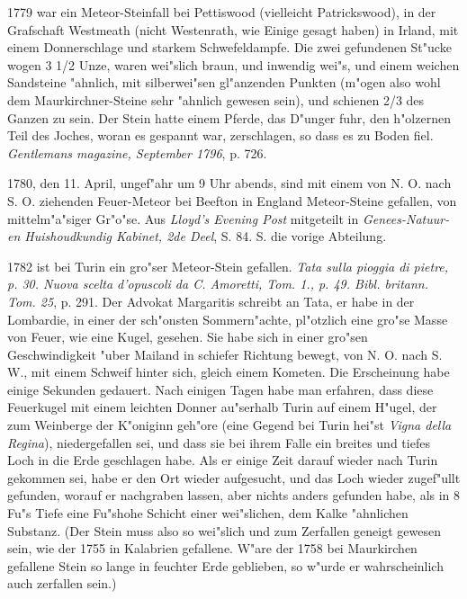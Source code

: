 \documentclass[a4paper, 11pt, oneside, polutonikogreek, german]{article}
\begin{document}
1779 war ein Meteor-Steinfall bei Pettiswood (vielleicht Patrickswood), in der Grafschaft Westmeath (nicht Westenrath, wie Einige gesagt haben) in Irland, mit einem Donnerschlage und starkem Schwefeldampfe. Die zwei gefundenen St"ucke wogen 3 1/2 Unze, waren wei"slich braun, und inwendig wei"s, und einem weichen Sandsteine "ahnlich, mit silberwei"sen gl"anzenden Punkten (m"ogen also wohl dem Maurkirchner-Steine sehr "ahnlich gewesen sein), und schienen 2/3 des Ganzen zu sein. Der Stein hatte einem Pferde, das D"unger fuhr, den h"olzernen Teil des Joches, woran es gespannt war, zerschlagen, so dass es zu Boden fiel. \emph{Gentlemans magazine, September 1796}, p. 726.

1780, den 11. April, ungef"ahr um 9 Uhr abends, sind mit einem von N. O. nach S. O. ziehenden Feuer-Meteor bei Beefton in England Meteor-Steine gefallen, von mittelm"a"siger Gr"o"se. Aus \emph{Lloyd's Evening Post} mitgeteilt in \emph{Genees-Natuur-en Huishoudkundig Kabinet, 2de Deel}, S. 84. S. die vorige Abteilung.

1782 ist bei Turin ein gro"ser Meteor-Stein gefallen. \emph{Tata sulla pioggia di pietre, p. 30. Nuova scelta d'opuscoli da C. Amoretti, Tom. 1., p. 49. Bibl. britann. Tom. 25}, p. 291. Der Advokat Margaritis schreibt an Tata, er habe in der Lombardie, in einer der sch"onsten Sommern"achte, pl"otzlich eine gro"se Masse von Feuer, wie eine Kugel, gesehen. Sie habe sich in einer gro"sen Geschwindigkeit "uber Mailand in schiefer Richtung bewegt, von N. O. nach S. W., mit einem Schweif hinter sich, gleich einem Kometen. Die Erscheinung habe einige Sekunden gedauert. Nach einigen Tagen habe man erfahren, dass diese Feuerkugel mit einem leichten Donner au"serhalb Turin auf einem H"ugel, der zum Weinberge der K"oniginn geh"ore (eine Gegend bei Turin hei"st \emph{Vigna della Regina}), niedergefallen sei, und dass sie bei ihrem Falle ein breites und tiefes Loch in die Erde geschlagen habe. Als er einige Zeit darauf wieder nach Turin gekommen sei, habe er den Ort wieder aufgesucht, und das Loch wieder zugef"ullt gefunden, worauf er nachgraben lassen, aber nichts anders gefunden habe, als in 8 Fu"s Tiefe eine Fu"shohe Schicht einer wei"slichen, dem Kalke "ahnlichen Substanz. (Der Stein muss also so wei"slich und zum Zerfallen geneigt gewesen sein, wie der 1755 in Kalabrien gefallene. W"are der 1758 bei Maurkirchen gefallene Stein so lange in feuchter Erde geblieben, so w"urde er wahrscheinlich auch zerfallen sein.)
\end{document}

